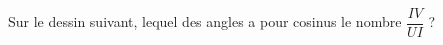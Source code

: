 
\begin{exercice}\label{exo2smath-0144}

    Sur le dessin suivant, lequel des angles a pour cosinus le nombre \( \dfrac{ IV }{ UI }\) ?

\begin{center}
   
\end{center}

\end{exercice}
